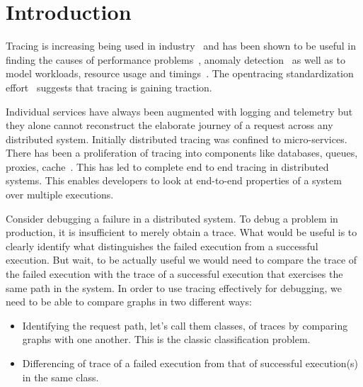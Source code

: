 \section{Introduction}
Tracing is increasing being used in industry~\cite{Jegeur, Zipkin, 36356} and has been shown to be useful in finding the causes of performance problems~\cite{36356, Fonseca:2007:XPN:1973430.1973450, Reynolds:2006:PDU:1267680.1267689, DBLP:conf/sigmetrics/ThereskaSSWALG06, Sambasivan:2011:DPC:1972457.1972463}, anomaly detection~\cite{Barham:2003:MOM:1251054.1251069, Chen:2004:PFE:1251175.1251198, 37477, Sambasivan:2011:DPC:1972457.1972463} as well as to model workloads, resource usage and timings~\cite{37520, Chanda:2007:WTP:1272996.1273001, 36356, DBLP:conf/sigmetrics/ThereskaSSWALG06, Barham:2003:MOM:1251054.1251069}.  The opentracing standardization effort~\cite{OpenTracing} suggests that tracing is gaining traction.

Individual services have always been augmented with logging and telemetry but they alone cannot reconstruct the elaborate journey of a request across any distributed system. Initially distributed tracing was confined to micro-services. There has been a proliferation of tracing into components like databases, queues, proxies, cache~\cite{OpenTracingCassandra, OpenTracingKafka, OpenTracingRedis}. This has led to complete end to end tracing in distributed systems. This enables developers to look at end-to-end properties of a system over multiple executions.

Consider debugging a failure in a distributed system. To debug a problem in production, it is insufficient to merely obtain a trace. What would be useful is to clearly identify what distinguishes the failed execution from a successful execution. But wait, to be actually useful we would need to compare the trace of the failed execution with the trace of a successful execution that exercises the same path in the system. In order to use tracing effectively for debugging, we need to be able to compare graphs in two different ways:
\begin{itemize}
\item Identifying the request path, let's call them classes, of traces by comparing graphs with one another. This is the classic classification problem.
\item Differencing of trace of a failed execution from that of successful execution(s) in the same class.
\end{itemize}

